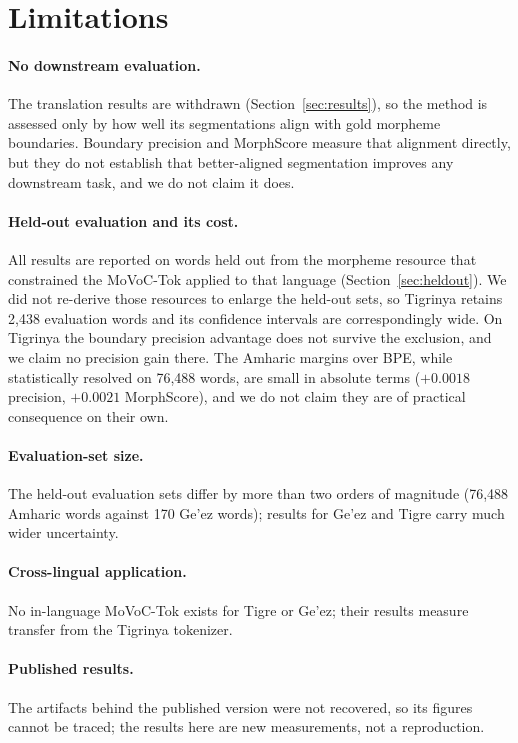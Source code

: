 \documentclass[11pt]{article}
\newcommand{\movoctok}{MoVoC-Tok}
\begin{document}
\section*{Limitations}

\paragraph{No downstream evaluation.} The translation results are withdrawn
(Section~\ref{sec:results}), so the method is assessed only by how well its
segmentations align with gold morpheme boundaries. Boundary precision and
MorphScore measure that alignment directly, but they do not establish that
better-aligned segmentation improves any downstream task, and we do not claim
it does.

\paragraph{Held-out evaluation and its cost.} All results are reported on
words held out from the morpheme resource that constrained the \movoctok{}
applied to that language (Section~\ref{sec:heldout}). We did not re-derive those
resources to enlarge the held-out sets, so Tigrinya retains 2,438 evaluation
words and its confidence intervals are correspondingly wide. On Tigrinya the
boundary precision advantage does not survive the exclusion, and we claim no
precision gain there. The Amharic margins over BPE, while statistically
resolved on 76,488 words, are small in absolute terms ($+0.0018$ precision,
$+0.0021$ MorphScore), and we do not claim they are of practical consequence
on their own.

\paragraph{Evaluation-set size.} The held-out evaluation sets differ by more
than two orders of magnitude (76,488 Amharic words against 170 Ge'ez words);
results for Ge'ez and Tigre carry much wider uncertainty.

\paragraph{Cross-lingual application.} No in-language \movoctok{} exists for
Tigre or Ge'ez; their results measure transfer from the Tigrinya tokenizer.

\paragraph{Published results.} The artifacts behind the published version
were not recovered, so its figures cannot be traced; the results here are new
measurements, not a reproduction.
\end{document}
